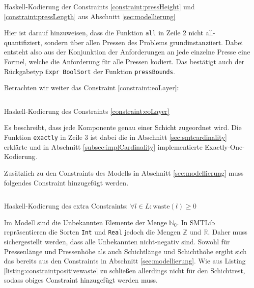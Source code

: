 \begin{listing}[H]
    \inputminted[linenos=true]{haskell}{Code/Implementierung/ConstraintPressenDimensionen.hs}
    \caption{Haskell-Kodierung der Constraints \ref{constraint:pressHeight} und \ref{constraint:pressLength} aus Abschnitt \ref{sec:modellierung}}
    \label{listing:constraintimplpressdim}
\end{listing}

Hier ist darauf hinzuweisen, dass die Funktion \texttt{all} in Zeile 2 nicht all-quantifiziert, sondern über allen Pressen des Problems grundinstanziiert.
Dabei entsteht also aus der Konjunktion der Anforderungen an jede einzelne Presse eine Formel, welche die Anforderung für alle Pressen kodiert.
Das bestätigt auch der Rückgabetyp \texttt{Expr BoolSort} der Funktion \texttt{pressBounds}.

Betrachten wir weiter das Constraint \ref{constraint:eoLayer}:

\begin{listing}[H]
    \inputminted[linenos=true]{haskell}{Code/Implementierung/ConstraintCompInAmoLayer.hs}
    \caption{Haskell-Kodierung des Constraints \ref{constraint:eoLayer}}
    \label{listing:constraintimplamolayer}
\end{listing}

Es beschreibt, dass jede Komponente genau einer Schicht zugeordnet wird.
Die Funktion \texttt{exactly} in Zeile 3 ist dabei die in Abschnitt \ref{sec:smtcardinality} erklärte und in Abschnitt \ref{subsec:implCardinality} implementierte
Exactly-One-Kodierung.

Zusätzlich zu den Constraints des Modells in Abschnitt \ref{sec:modellierung} muss folgendes Constraint hinzugefügt werden.

\begin{listing}[H]
    \inputminted[linenos=true]{haskell}{Code/Implementierung/ConstraintPositiveWaste.hs}
    \caption{Haskell-Kodierung des extra Constraints: $\forall l \in L: \text{waste}(l) \geq 0$}
    \label{listing:constraintpositivewaste}
\end{listing}

Im Modell sind die Unbekannten Elemente der Menge $\mathbb{N}_0$.
In SMTLib repräsentieren die Sorten \texttt{Int} und \texttt{Real} jedoch die Mengen $\mathbb{Z}$ und $\mathbb{R}$.
Daher muss sichergestellt werden, dass alle Unbekannten nicht-negativ sind.
Sowohl für Pressenlänge und Pressenhöhe als auch Schichtlänge und Schichthöhe ergibt sich das bereits aus den Constraints in Abschnitt \ref{sec:modellierung}.
Wie aus Listing \ref{listing:constraintpositivewaste} zu schließen allerdings nicht für den Schichtrest, sodass obiges Constraint hinzugefügt werden muss.

